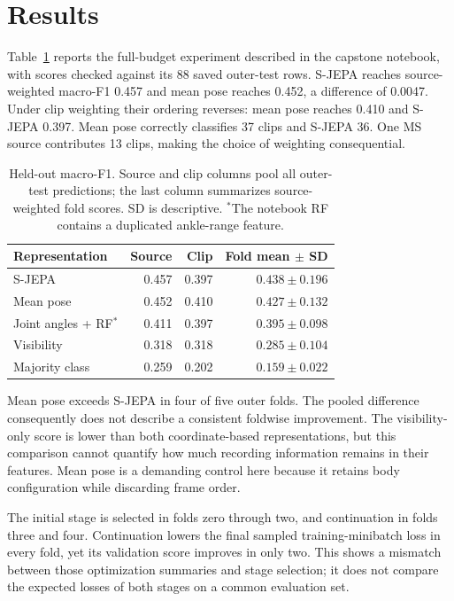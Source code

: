 \documentclass[10pt,twocolumn,letterpaper]{article}
\begin{document}
\section{Results}
Table~\ref{tab:results} reports the full-budget experiment described in the capstone notebook, with scores checked against its 88 saved outer-test rows. S-JEPA reaches source-weighted macro-F1 0.457 and mean pose reaches 0.452, a difference of 0.0047. Under clip weighting their ordering reverses: mean pose reaches 0.410 and S-JEPA 0.397. Mean pose correctly classifies 37 clips and S-JEPA 36. One MS source contributes 13 clips, making the choice of weighting consequential.

\begin{table}[t]
\centering
\caption{Held-out macro-F1. Source and clip columns pool all outer-test predictions; the last column summarizes source-weighted fold scores. SD is descriptive. $^*$The notebook RF contains a duplicated ankle-range feature.}
\label{tab:results}
\small
\setlength{\tabcolsep}{4pt}
\begin{tabular}{lrrr}
\toprule
Representation & Source & Clip & Fold mean $\pm$ SD\\
\midrule
S-JEPA &0.457&0.397&$0.438\pm0.196$\\
Mean pose &0.452&0.410&$0.427\pm0.132$\\
Joint angles + RF$^*$ &0.411&0.397&$0.395\pm0.098$\\
Visibility &0.318&0.318&$0.285\pm0.104$\\
Majority class &0.259&0.202&$0.159\pm0.022$\\
\bottomrule
\end{tabular}
\end{table}

Mean pose exceeds S-JEPA in four of five outer folds. The pooled difference consequently does not describe a consistent foldwise improvement. The visibility-only score is lower than both coordinate-based representations, but this comparison cannot quantify how much recording information remains in their features. Mean pose is a demanding control here because it retains body configuration while discarding frame order.

The initial stage is selected in folds zero through two, and continuation in folds three and four. Continuation lowers the final sampled training-minibatch loss in every fold, yet its validation score improves in only two. This shows a mismatch between those optimization summaries and stage selection; it does not compare the expected losses of both stages on a common evaluation set.
\end{document}
